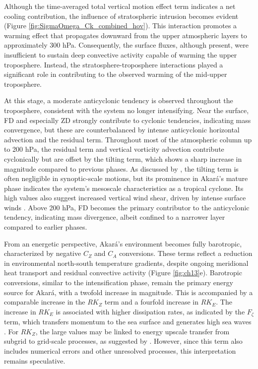 \documentclass[pdflatex,sn-chicago]{sn-jnl}%
\theoremstyle{plain}
\theoremstyle{definition}
\theoremstyle{remark}
\theoremstyle{definition}
\begin{document}
Although the time-averaged total vertical motion effect term indicates a net cooling contribution, the influence of stratospheric intrusion becomes evident (Figure \ref{fig:SigmaOmega_Ck_combined_hov}). This interaction promotes a warming effect that propagates downward from the upper atmospheric layers to approximately 300 hPa. Consequently, the surface fluxes, although present, were insufficient to sustain deep convective activity capable of warming the upper troposphere. Instead, the stratosphere-troposphere interactions played a significant role in contributing to the observed warming of the mid-upper troposphere.

At this stage, a moderate anticyclonic tendency is observed throughout the troposphere, consistent with the system no longer intensifying. Near the surface, FD and especially ZD strongly contribute to cyclonic tendencies, indicating mass convergence, but these are counterbalanced by intense anticyclonic horizontal advection and the residual term. Throughout most of the atmospheric column up to 200 hPa, the residual term and vertical vorticity advection contribute cyclonically but are offset by the tilting term, which shows a sharp increase in magnitude compared to previous phases. As discussed by \citet{dutra2017structure}, the tilting term is often negligible in synoptic-scale motions, but its prominence in Akará's mature phase indicates the system's mesoscale characteristics as a tropical cyclone. Its high values also suggest increased vertical wind shear, driven by intense surface winds \citep{reboita2024assessment}. Above 200 hPa, FD becomes the primary contributor to the anticyclonic tendency, indicating mass divergence, albeit confined to a narrower layer compared to earlier phases.

From an energetic perspective, Akará's environment becomes fully barotropic, characterized by negative $C_Z$ and $C_A$ conversions. These terms reflect a reduction in environmental north-south temperature gradients, despite ongoing meridional heat transport and residual convective activity (Figure \ref{fig:ch13}e). Barotropic conversions, similar to the intensification phase, remain the primary energy source for Akará, with a twofold increase in magnitude. This is accompanied by a comparable increase in the $RK_Z$ term and a fourfold increase in $RK_E$. The increase in $RK_E$ is associated with higher dissipation rates, as indicated by the $F_{\zeta}$ term, which transfers momentum to the sea surface and generates high sea waves \citep[e.g.,]{zhao2022effects,shimura2024footprint}. For $RK_Z$, the large values may be linked to energy upscale transfer from subgrid to grid-scale processes, as suggested by \citet{michaelides1987limited}. However, since this term also includes numerical errors and other unresolved processes, this interpretation remains speculative. 
\end{document}
